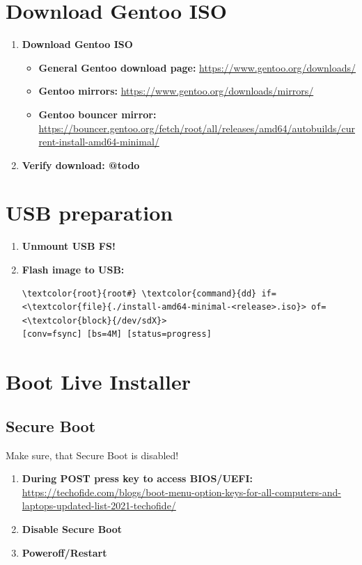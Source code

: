 \documentclass[10pt, a4paper, onecolumn, oneside, titlepage, openany]{book}
\begin{document}
\section{Download Gentoo ISO}
\begin{enumerate}
    \item \textbf{Download Gentoo ISO}
    \begin{itemize}
        \item \textbf{General Gentoo download page:}
\newline \url{https://www.gentoo.org/downloads/}
        \item \textbf{Gentoo mirrors:}
\newline \url{https://www.gentoo.org/downloads/mirrors/}
        \item \textbf{Gentoo bouncer mirror:}
\newline \url{https://bouncer.gentoo.org/fetch/root/all/releases/amd64/autobuilds/current-install-amd64-minimal/}
    \end{itemize}
    \item \textbf{Verify download: @todo}
\end{enumerate}

\section{USB preparation}
\begin{enumerate}
    \item \textbf{Unmount USB FS!}
    \item \textbf{Flash image to USB:}
\begin{Verbatim}[commandchars=\\\{\}]
\textcolor{root}{root#} \textcolor{command}{dd} if=<\textcolor{file}{./install-amd64-minimal-<release>.iso}> of=<\textcolor{block}{/dev/sdX}>
[conv=fsync] [bs=4M] [status=progress]
\end{Verbatim}
\end{enumerate}

\section{Boot Live Installer}
\subsection{Secure Boot}
Make sure, that Secure Boot is disabled!
\begin{enumerate}
    \item \textbf{During POST press key to access BIOS/UEFI:}
\newline \href{https://techofide.com/blogs/boot-menu-option-keys-for-all-computers-and-laptops-updated-list-2021-techofide/}{https://techofide.com/blogs/boot-menu-option-keys-for-all-computers-and-laptops-updated-list-2021-techofide/}
    \item \textbf{Disable Secure Boot}
    \item \textbf{Poweroff/Restart}
\end{enumerate}
\end{document}
